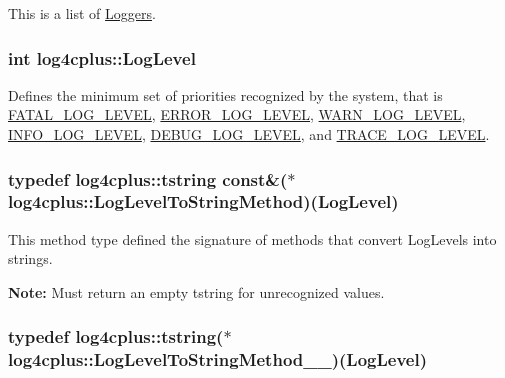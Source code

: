 This is a list of \hyperlink{classlog4cplus_1_1Logger}{Loggers}. \hypertarget{namespacelog4cplus_abd332cc8c98fefcbbdcf57b6b3867de9}{
\subsubsection[{Log\-Level}]{\setlength{\rightskip}{0pt plus 5cm}int {\bf log4cplus\-::\-Log\-Level}}}\label{namespacelog4cplus_abd332cc8c98fefcbbdcf57b6b3867de9}
Defines the minimum set of priorities recognized by the system, that is \hyperlink{namespacelog4cplus_a76a5d06eac76291ab55ec042d81c028a}{F\-A\-T\-A\-L\-\_\-\-L\-O\-G\-\_\-\-L\-E\-V\-E\-L}, \hyperlink{namespacelog4cplus_a4828581892f170bb319d5719f88178f3}{E\-R\-R\-O\-R\-\_\-\-L\-O\-G\-\_\-\-L\-E\-V\-E\-L}, \hyperlink{namespacelog4cplus_a042650a0a6fd89ef9b23c39185d438c9}{W\-A\-R\-N\-\_\-\-L\-O\-G\-\_\-\-L\-E\-V\-E\-L}, \hyperlink{namespacelog4cplus_a4275eaa8f9ec01a87bfec24d6b87cdb6}{I\-N\-F\-O\-\_\-\-L\-O\-G\-\_\-\-L\-E\-V\-E\-L}, \hyperlink{namespacelog4cplus_a9d74faee54b25eca5298aa2f0add28d7}{D\-E\-B\-U\-G\-\_\-\-L\-O\-G\-\_\-\-L\-E\-V\-E\-L}, and \hyperlink{namespacelog4cplus_a4ee6ad08f0e8c93a9ac1ad4678115ca6}{T\-R\-A\-C\-E\-\_\-\-L\-O\-G\-\_\-\-L\-E\-V\-E\-L}. \hypertarget{namespacelog4cplus_affe4873120aa349e25a21f2e0925f3d4}{
\subsubsection[{Log\-Level\-To\-String\-Method}]{\setlength{\rightskip}{0pt plus 5cm}typedef {\bf log4cplus\-::tstring} const\&($\ast$ log4cplus\-::\-Log\-Level\-To\-String\-Method)({\bf Log\-Level})}}\label{namespacelog4cplus_affe4873120aa349e25a21f2e0925f3d4}
This method type defined the signature of methods that convert Log\-Levels into strings.

{\bfseries Note\-:} Must return an empty {\ttfamily tstring} for unrecognized values. \hypertarget{namespacelog4cplus_adaf78472c00019b22f0da0d2ccecc3ca}{
\subsubsection[{Log\-Level\-To\-String\-Method\-\_\-1\-\_\-0}]{\setlength{\rightskip}{0pt plus 5cm}typedef {\bf log4cplus\-::tstring}($\ast$ log4cplus\-::\-Log\-Level\-To\-String\-Method\-\_\-\_)({\bf Log\-Level})}}\label{namespacelog4cplus_adaf78472c00019b22f0da0d2ccecc3ca}


